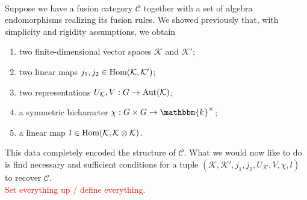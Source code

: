 \noindent\\ Suppose we have a fusion category $\mathcal{C}$ together with a set of algebra endomorphisms realizing its fusion rules. We showed previously that, with simplicity and rigidity assumptions, we obtain
\begin{enumerate}[label=\textup{(\roman*).}, ref=\textup{(\roman*)}, leftmargin=4\parindent]
\item two finite-dimensional vector spaces $\mathcal{K}$ and $\mathcal{K}'$;
\item two linear maps $j_1, j_2 \in \textup{Hom}(\mathcal{K}, \mathcal{K}')$;
\item two representations $U_\mathcal{K}, V : G \to \textup{Aut}(\mathcal{K})$;
\item a symmetric bicharacter $\chi : G \times G \to \mathbbm{k}^\times$;
\item a linear map $l \in \textup{Hom}(\mathcal{K}, \mathcal{K} \otimes \mathcal{K})$.
\end{enumerate}
\noindent This data completely encoded the structure of $\mathcal{C}$. What we would now like to do is find necessary and sufficient conditions for a tuple $(\mathcal{K}, \mathcal{K}', j_1, j_2, U_\mathcal{K}, V, \chi, l)$ to recover $\mathcal{C}$.\\

\noindent\textcolor{red}{Set everything up / define everything.}\\

